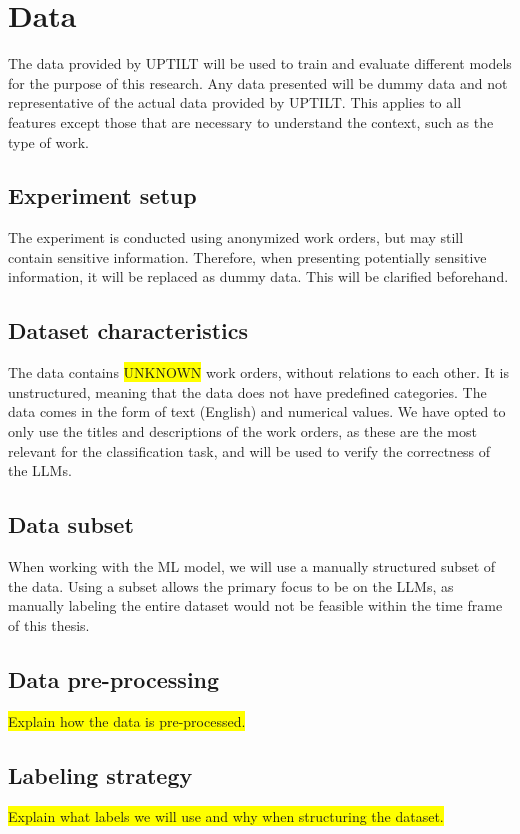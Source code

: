 \section{Data}

The data provided by UPTILT will be used to train and evaluate different models
for the purpose of this research. Any data presented will be dummy data and not representative
of the actual data provided by UPTILT. This applies to all features except those
that are necessary to understand the context, such as the type of work.

\subsection{Experiment setup}

The experiment is conducted using anonymized work orders, but may still contain sensitive
information. Therefore, when presenting potentially sensitive information, it
will be replaced as dummy data. This will be clarified beforehand.

\subsection{Dataset characteristics}

The data contains \colorbox{yellow}{UNKNOWN} work orders, without relations to each
other. It is unstructured, meaning that the data does not have predefined categories.
The data comes in the form of text (English) and numerical values. We have opted to
only use the titles and descriptions of the work orders, as these are the most
relevant for the classification task, and will be used to verify the correctness
of the LLMs.

\subsection{Data subset}

When working with the ML model, we will use a manually structured subset of the data.
Using a subset allows the primary focus to be on the LLMs, as manually labeling the
entire dataset would not be feasible within the time frame of this thesis.

\subsection{Data pre-processing}

\colorbox{yellow}{Explain how the data is pre-processed.}


\subsection{Labeling strategy}

\colorbox{yellow}{Explain what labels we will use and why when structuring the
dataset.}
